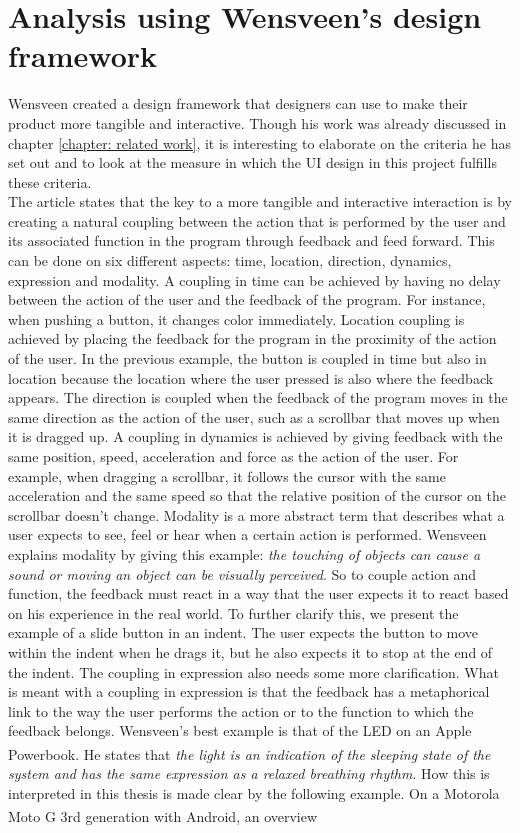 \section{Analysis using Wensveen's design framework}

Wensveen \cite{Wensveen2004} created a design framework that designers can use to make their product more tangible and interactive. Though his work was already discussed in chapter \ref{chapter: related work}, it is interesting to elaborate on the criteria he has set out and to look at the measure in which the UI design in this project fulfills these criteria.\\

The article states that the key to a more tangible and interactive interaction is by creating a natural coupling between the action that is performed by the user and its associated function in the program through feedback and feed forward. This can be done on six different aspects: time, location, direction, dynamics, expression and modality. A coupling in time can be achieved by having no delay between the action of the user and the feedback of the program. For instance, when pushing a button, it changes color immediately. Location coupling is achieved by placing the feedback for the program in the proximity of the action of the user. In the previous example, the button is coupled in time but also in location because the location where the user pressed is also where the feedback appears. The direction is coupled when the feedback of the program moves in the same direction as the action of the user, such as a scrollbar that moves up when it is dragged up. A coupling in dynamics is achieved by giving feedback with the same position, speed, acceleration and force as the action of the user. For example, when dragging a scrollbar, it follows the cursor with the same acceleration and the same speed so that the relative position of the cursor on the scrollbar doesn't change. Modality is a more abstract term that describes what a user expects to see, feel or hear when a certain action is performed. Wensveen explains modality by giving this example: \emph{the touching of objects can cause a sound or moving an object can be visually perceived}. So to couple action and function, the feedback must react in a way that the user expects it to react based on his experience in the real world. To further clarify this, we present the example of a slide button in an indent. The user expects the button to move within the indent when he drags it, but he also expects it to stop at the end of the indent. The coupling in expression also needs some more clarification. What is meant with a coupling in expression is that the feedback has a metaphorical link to the way the user performs the action or to the function to which the feedback belongs. Wensveen's best example is that of the LED on an Apple Powerbook\textsuperscript{\textregistered}. He states that \emph{the light is an indication of the sleeping state of the system and has the same expression as a relaxed breathing rhythm}. How this is interpreted in this thesis is made clear by the following example. On a Motorola Moto G\textsuperscript{\textregistered} 3rd generation with Android\textsuperscript{\textregistered}, an overview 
